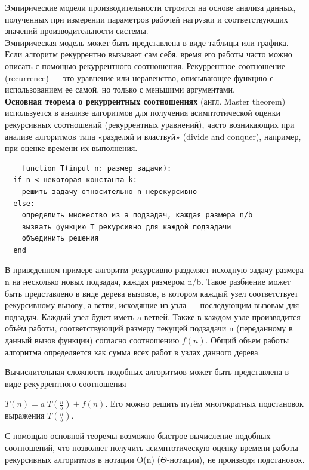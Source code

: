 \documentclass[12pt, a4paper]{article}
\begin{document}
Эмпирические модели производительности строятся на основе анализа данных, полученных при измерении параметров рабочей нагрузки и соответствующих значений производительности системы.\\

Эмпирическая модель может быть представлена в виде таблицы или графика.\\

Если алгоритм рекуррентно вызывает сам себя, время его работы часто можно описать с помощью рекуррентного соотношения. Рекуррентное соотношение (recurrence) — это уравнение или неравенство, описывающее функцию с использованием ее самой, но только с меньшими аргументами.\\

\textbf{Основная теорема о рекуррентных соотношениях} (англ. Master theorem) используется в анализе алгоритмов для получения асимптотической оценки рекурсивных соотношений (рекуррентных уравнений), часто возникающих при анализе алгоритмов типа «разделяй и властвуй» (divide and conquer), например, при оценке времени их выполнения. 

\begin{verbatim}
    function T(input n: размер задачи):
  if n < некоторая константа k:
    решить задачу относительно n нерекурсивно
  else:
    определить множество из a подзадач, каждая размера n/b
    вызвать функцию T рекурсивно для каждой подзадачи
    объединить решения
  end
\end{verbatim}

В приведенном примере алгоритм рекурсивно разделяет исходную задачу размера n на несколько новых подзадач, каждая размером n/b. Такое разбиение может быть представлено в виде дерева вызовов, в котором каждый узел соответствует рекурсивному вызову, а ветви, исходящие из узла — последующим вызовам для подзадач. Каждый узел будет иметь a ветвей. Также в каждом узле производится объём работы, соответствующий размеру текущей подзадачи n (переданному в данный вызов функции) согласно соотношению $f(n)$. Общий объем работы алгоритма определяется как сумма всех работ в узлах данного дерева.

Вычислительная сложность подобных алгоритмов может быть представлена в виде рекуррентного соотношения

${\displaystyle T(n)=a\;T\left({\frac {n}{b}}\right)+f(n)}$. Его можно решить путём многократных подстановок выражения ${\displaystyle T\left({\frac {n}{b}}\right)}$.

С помощью основной теоремы возможно быстрое вычисление подобных соотношений, что позволяет получить асимптотическую оценку времени работы рекурсивных алгоритмов в нотации O(n) ($\Theta$-нотации), не производя подстановок.
\end{document}
